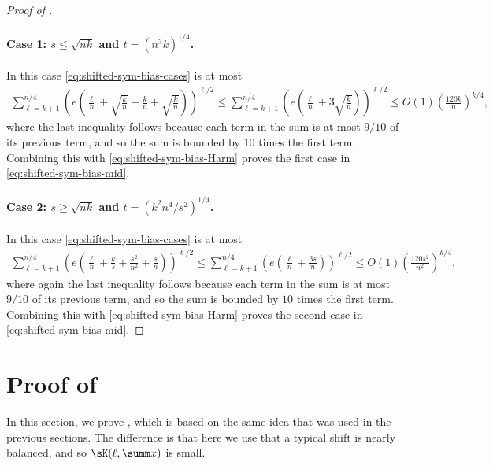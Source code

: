 \begin{proof}[Proof of ]
  \paragraph{Case 1: $s \le \sqrt{nk}$ and $t = (n^3k)^{1/4}$.}
  In this case \cref{eq:shifted-sym-bias-cases} is at most
  \begin{align*}
    \sum_{\ell=k+1}^{n/4} \left( e \left( \frac{\ell}{n} + \sqrt{\frac{k}{n}} + \frac{k}{n} + \sqrt{\frac{k}{n}}  \right) \right)^{\ell/2}
    \le \sum_{\ell=k+1}^{n/4} \left( e \left( \frac{\ell}{n} + 3\sqrt{\frac{k}{n}}\right) \right)^{\ell/2}
    \le O(1) \left( \frac{120k}{n} \right)^{k/4} ,
  \end{align*}
  where the last inequality follows because each term in the sum is at most $9/10$ of its previous term, and so the sum is bounded by $10$ times the first term.
  Combining this with \cref{eq:shifted-sym-bias-Harm} proves the first case in \cref{eq:shifted-sym-bias-mid}.

  \paragraph{Case 2: $s \ge \sqrt{nk}$ and $t = (k^2n^4/s^2)^{1/4}$.}
  In this case \cref{eq:shifted-sym-bias-cases} is at most
   \begin{align*}
    \sum_{\ell=k+1}^{n/4} \left( e \left( \frac{\ell}{n} + \frac{k}{s} + \frac{s^2}{n^2} + \frac{s}{n} \right) \right)^{\ell/2}
    \le \sum_{\ell=k+1}^{n/4} \left( e \left( \frac{\ell}{n} + \frac{3s}{n} \right) \right)^{\ell/2} 
    \le O(1) \left( \frac{120s^2}{n^2} \right)^{k/4} ,
  \end{align*}
  where again the last inequality follows because each term in the sum is at most $9/10$ of its previous term, and so the sum is bounded by $10$ times the first term.
  Combining this with \cref{eq:shifted-sym-bias-Harm} proves the second case in \cref{eq:shifted-sym-bias-mid}.
  \end{proof}

\section{Proof of } \label{sec:Bazzi}
In this section, we prove , which is based on the same idea that was used in the previous sections.  The difference is that here we use that a typical shift is nearly balanced, and so $\sK(\ell,\summ x)$ is small.

